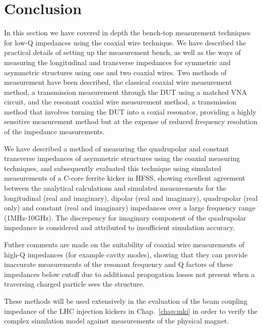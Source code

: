 \section{Conclusion}

In this section we have covered in depth the bench-top measurement techniques for low-Q impedances using the coaxial wire technique. We have described the practical details of setting up the measurement bench, as well as the ways of measuring the longitudinal and transverse impedances for symmetric and asymmetric structures using one and two coaxial wires. Two methods of measurement have been described, the classical coaxial wire measurement method, a transmission measurement through the DUT using a matched VNA circuit, and the resonant coaxial wire measurement method, a transmission method that involves turning the DUT into a coxial resonator, providing a highly sensitive measurement method but at the expense of reduced frequency resolution of the impedance measurements.

We have described a method of measuring the quadrupolar and constant transverse impedances of asymmetric structures using the coaxial measuring techniques, and subsequently evaluated this technique using simulated measurements of a C-core ferrite kicker in HFSS, showing excellent agreement between the analytical calculations and simulated measurements for the longitudinal (real and imaginary), dipolar (real and imaginary), quadrupolar (real only) and constant (real and imaginary) impedances over a large frequency range (1MHz-10GHz). The discrepency for imaginary component of the quadrupolar impedance is considered and attributed to insufficient simulation accuracy.

Futher comments are made on the suitability of coaxial wire measurements of high-Q impedances (for example cavity modes), showing that they can provide inaccurate measurements of the resonant frequency and Q factors of these impedances below cutoff due to additional propogation losses not present when a traversing charged particle sees the structure.

These methods will be used extensively in the evaluation of the beam coupling impedance of the LHC injection kickers in Chap.~\ref{chap:mki} in order to verify the complex simulation model against measurements of the physical magnet.
